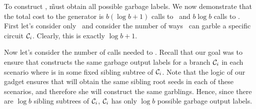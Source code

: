To construct \gadget, \G must obtain all possible garbage labels. 
We now demonstrate that the total cost to the generator is $b (\log b + 1)$ calls to \Gb\ and $b \log b$ calls to \Ev.
First let’s consider only \Gb\ and consider the number of ways \E\ can garble a specific circuit $\mathcal C_i$. Clearly, this is exactly $\log b+1$.

Now let’s consider the number of calls needed to \Ev.
Recall that our goal was to ensure that \E constructs the same garbage output labels for a branch $\mathcal C_i$ in each scenario where \aid is in some fixed sibling subtree of $\mathcal C_i$. Note that the logic of our gadget ensures that \E will obtain the same sibling root seeds in each of these scenarios, and therefore she will construct the same garblings. Hence, since there are $\log b$ sibling subtrees of $\mathcal C_i$, $\mathcal C_i$ has only $\log b$ possible garbage output labels.






















